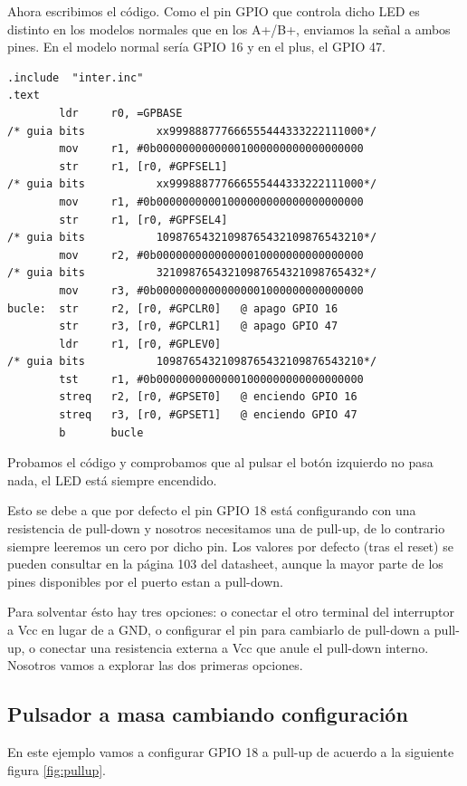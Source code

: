 Ahora escribimos el código. Como el pin GPIO que controla dicho LED es distinto en los
modelos normales que en los A+/B+, enviamos la señal a ambos pines. En el modelo normal
sería GPIO 16 y en el plus, el GPIO 47.

\newpage
\begin{lstlisting}[caption={apend1.s},label={lst:codigoApendice_1}]
        .include  "inter.inc"
.text
        ldr     r0, =GPBASE
/* guia bits           xx999888777666555444333222111000*/
        mov     r1, #0b00000000000001000000000000000000
        str     r1, [r0, #GPFSEL1]
/* guia bits           xx999888777666555444333222111000*/
        mov     r1, #0b00000000001000000000000000000000
        str     r1, [r0, #GPFSEL4]
/* guia bits           10987654321098765432109876543210*/
        mov     r2, #0b00000000000000010000000000000000
/* guia bits           32109876543210987654321098765432*/
        mov     r3, #0b00000000000000001000000000000000
bucle:  str     r2, [r0, #GPCLR0]   @ apago GPIO 16
        str     r3, [r0, #GPCLR1]   @ apago GPIO 47
        ldr     r1, [r0, #GPLEV0]
/* guia bits           10987654321098765432109876543210*/
        tst     r1, #0b00000000000001000000000000000000
        streq   r2, [r0, #GPSET0]   @ enciendo GPIO 16
        streq   r3, [r0, #GPSET1]   @ enciendo GPIO 47
        b       bucle
\end{lstlisting}

Probamos el código y comprobamos que al pulsar el botón izquierdo no pasa nada,
el LED está siempre encendido.

Esto se debe a que por defecto el pin GPIO 18 está configurando con una resistencia de
pull-down y nosotros necesitamos una de pull-up, de lo contrario siempre leeremos un cero
por dicho pin. Los valores por defecto (tras el reset) se pueden consultar en la página
103 del datasheet, aunque la mayor parte de los pines disponibles por el puerto estan
a pull-down.

Para solventar ésto hay tres opciones: o conectar el otro terminal del interruptor a Vcc en
lugar de a GND, o configurar el pin para cambiarlo de pull-down a pull-up, o conectar una
resistencia externa a Vcc que anule el pull-down interno. Nosotros vamos a explorar las dos
primeras opciones.

\subsection{Pulsador a masa cambiando configuración}

En este ejemplo vamos a configurar GPIO 18 a pull-up de acuerdo a la siguiente
figura \ref{fig:pullup}.

